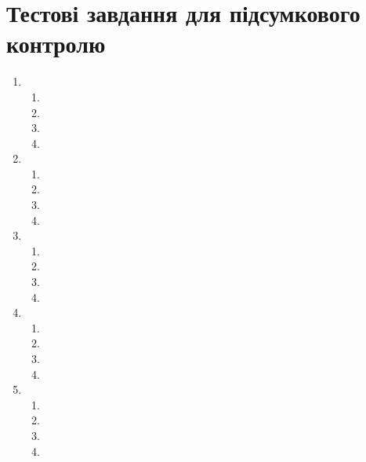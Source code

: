 \documentclass[twocolumn]{el-author}
\begin{document}
\newpage

\section{Тестові завдання для підсумкового контролю}

\begin{enumerate}
	\item 
	\begin{enumerate}
		\item 
		\item 
		\item 
		\item 
	\end{enumerate}
	\item 
	\begin{enumerate}
		\item 
		\item 
		\item 
		\item 
	\end{enumerate}
	\item 
	\begin{enumerate}
		\item 
		\item 
		\item 
		\item 
	\end{enumerate}
	\item 
	\begin{enumerate}
		\item 
		\item 
		\item 
		\item 
	\end{enumerate}
	\item 
	\begin{enumerate}
		\item 
		\item 
		\item 
		\item 
	\end{enumerate}
\end{enumerate}
\end{document}
